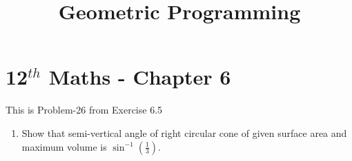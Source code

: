 \documentclass[12pt]{article}
\providecommand{\brak}[1]{\ensuremath{\left(#1\right)}}
\begin{document}
\begin{center}
\title{\textbf{Geometric Programming}}
\date{\vspace{-5ex}} %
\maketitle
\end{center}
\setcounter{page}{1}

\section{12$^{th}$ Maths - Chapter 6}
This is Problem-26 from Exercise 6.5 
\begin{enumerate}
\item Show that semi-vertical angle of right circular cone of given surface area and maximum volume is $\sin^{-1}\brak{\frac{1}{3}}$.


\end{enumerate}
\end{document}
